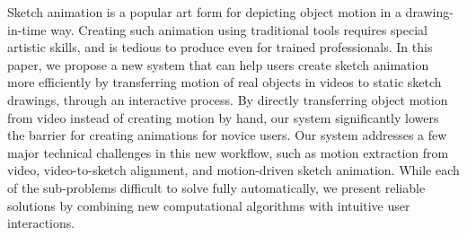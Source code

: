 Sketch animation is a popular art form for depicting object motion in a drawing-in-time way. 
Creating such animation using traditional tools requires special artistic skills, and is tedious to produce even for trained professionals. In this paper, we propose a new system that can help users create sketch animation more efficiently by transferring motion of real objects in videos to static sketch drawings, through an interactive process. 
By directly transferring object motion from video instead of creating motion by hand,  our system significantly lowers the barrier for creating animations for novice users.  
Our system addresses a few major technical challenges in this new workflow, such as  motion extraction from video, video-to-sketch alignment, and motion-driven sketch animation. While each of the sub-problems  difficult to solve fully automatically, we present reliable solutions by combining new computational algorithms with intuitive user interactions.

 